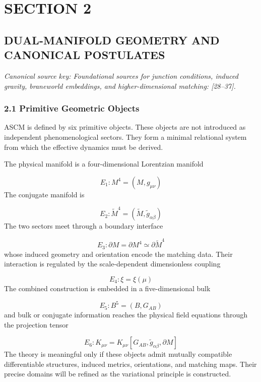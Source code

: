 \documentclass[aps,prd,onecolumn,superscriptaddress,nofootinbib,longbibliography,10pt]{revtex4-2}
\begin{document}
 

  
\section*{SECTION 2}

  
\subsection*{DUAL-MANIFOLD GEOMETRY AND CANONICAL POSTULATES}

  \textit{Canonical source key: Foundational sources for junction conditions, induced gravity, braneworld embeddings, and higher-dimensional matching: [28–37].}


  
\subsubsection*{2.1 Primitive Geometric Objects}

  ASCM is defined by six primitive objects. These objects are not introduced as independent phenomenological sectors. They form a minimal relational system from which the effective dynamics must be derived.


  The physical manifold is a four-dimensional Lorentzian manifold


  \[ E_1 : M^4 = (M, g_{\mu\nu}) \]
  The conjugate manifold is


  \[ E_2 : \tilde{M}^4 = (\tilde{M}, \tilde{g}_{\alpha\beta}) \]
  The two sectors meet through a boundary interface


  \[ E_3 : \partial M = \partial M^4 \simeq \partial \tilde{M}^4 \]
  whose induced geometry and orientation encode the matching data. Their interaction is regulated by the scale-dependent dimensionless coupling


  \[ E_4 : \xi = \xi(\mu) \]
  The combined construction is embedded in a five-dimensional bulk


  \[ E_5 : B^5 = (B, G_{AB}) \]
  and bulk or conjugate information reaches the physical field equations through the projection tensor


  \[ E_6 : K_{\mu\nu} = K_{\mu\nu}[G_{AB}, \tilde{g}_{\alpha\beta}, \partial M] \]
  The theory is meaningful only if these objects admit mutually compatible differentiable structures, induced metrics, orientations, and matching maps. Their precise domains will be refined as the variational principle is constructed.
\end{document}
